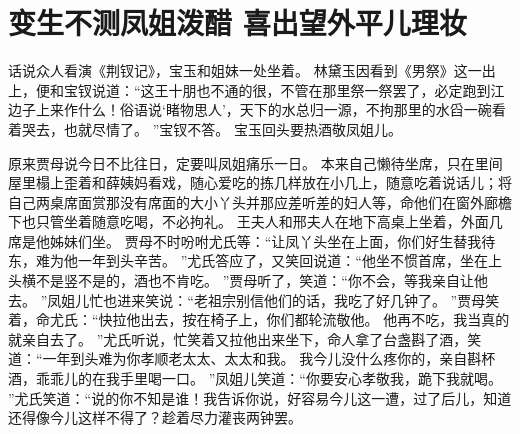\chapter{变生不测凤姐泼醋 \quad 喜出望外平儿理妆}
\par
话说众人看演《荆钗记》，宝玉和姐妹一处坐着。
林黛玉因看到《男祭》这一出上，便和宝钗说道：“这王十朋也不通的很，不管在那里祭一祭罢了，必定跑到江边子上来作什么！俗语说‘睹物思人’，天下的水总归一源，不拘那里的水舀一碗看着哭去，也就尽情了。
”宝钗不答。
宝玉回头要热酒敬凤姐儿。
\par
原来贾母说今日不比往日，定要叫凤姐痛乐一日。
本来自己懒待坐席，只在里间屋里榻上歪着和薛姨妈看戏，随心爱吃的拣几样放在小几上，随意吃着说话儿；将自己两桌席面赏那没有席面的大小丫头并那应差听差的妇人等，命他们在窗外廊檐下也只管坐着随意吃喝，不必拘礼。
王夫人和邢夫人在地下高桌上坐着，外面几席是他姊妹们坐。
贾母不时吩咐尤氏等：“让凤丫头坐在上面，你们好生替我待东，难为他一年到头辛苦。
”尤氏答应了，又笑回说道：“他坐不惯首席，坐在上头横不是竖不是的，酒也不肯吃。
”贾母听了，笑道：“你不会，等我亲自让他去。
”凤姐儿忙也进来笑说：“老祖宗别信他们的话，我吃了好几钟了。
”贾母笑着，命尤氏：“快拉他出去，按在椅子上，你们都轮流敬他。
他再不吃，我当真的就亲自去了。
”尤氏听说，忙笑着又拉他出来坐下，命人拿了台盏斟了酒，笑道：“一年到头难为你孝顺老太太、太太和我。
我今儿没什么疼你的，亲自斟杯酒，乖乖儿的在我手里喝一口。
”凤姐儿笑道：“你要安心孝敬我，跪下我就喝。
”尤氏笑道：“说的你不知是谁！我告诉你说，好容易今儿这一遭，过了后儿，知道还得像今儿这样不得了？趁着尽力灌丧两钟罢。
